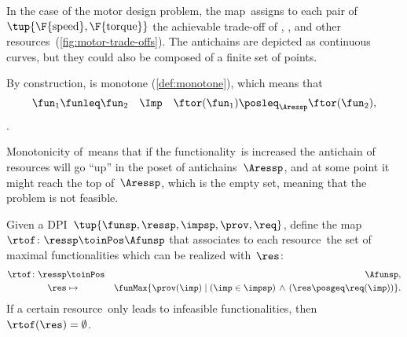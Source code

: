 \begin{example}
  In the case of the motor design problem, the map~\ftor assigns
  to each pair of~$\tup{\F{\text{speed}},\F{\text{torque}}}$
  the achievable trade-off of , , and other resources~(\cref{fig:motor-trade-offs}).
  The antichains are depicted as continuous curves, but they could also
  be composed of a finite set of points.

\end{example}


By construction, \ftor is monotone (\cref{def:monotone}), which means that
\begin{equation*}
  \fun_{1}\funleq\fun_{2}\quad\Imp\quad\ftor(\fun_{1})\posleq_{\Aressp}\ftor(\fun_{2}),
\end{equation*}.


Monotonicity of~\ftor means that if the functionality~\fun is increased the antichain of resources will go ``up'' in the poset of antichains~$\Aressp$,
and at some point it might reach the top of~$\Aressp$, which is the empty set, meaning that the problem is not feasible.

  
\begin{definition}
  \label{def:rtof}
  Given a DPI~$\tup{ \funsp,\ressp,\impsp,\prov,\req}$,
  define the map~$\rtof\colon \ressp\toinPos \Afunsp$ that associates
  to each resource~\res the set of maximal functionalities which can be realized with~$\res$:
  \begin{eqnarray*}
    \rtof\colon \ressp & \toinPos & \Afunsp,\\
    \res& \mapsto & \funMax\{\prov(\imp)\mid\left(\imp\in\impsp\right)\,\wedge\,\left(\res\posgeq\req(\imp)\right)\}.
  \end{eqnarray*}
  If a certain resource~\res only leads to infeasible functionalities, then~$\rtof(\res)=\emptyset$.
\end{definition}


